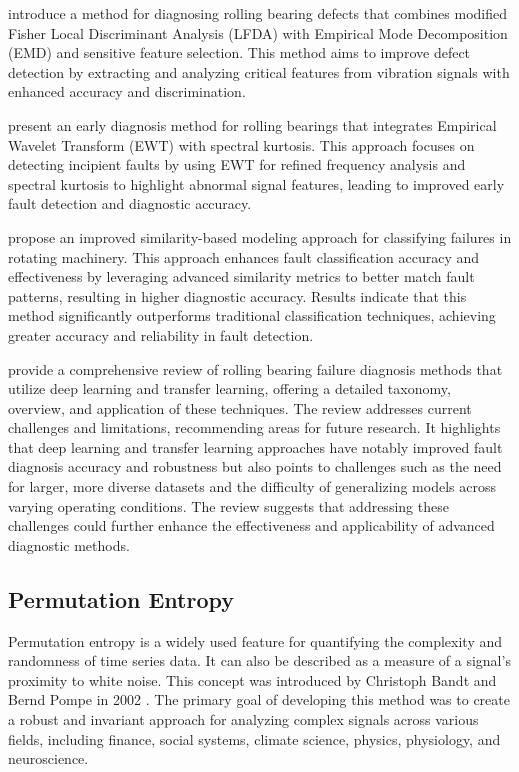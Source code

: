 \documentclass[sn-basic,pdflatex]{sn-jnl}
\theoremstyle{remark}
\theoremstyle{definition}
\begin{document}
\citet{WOS:000426284100001} introduce a method for diagnosing rolling
bearing defects that combines modified Fisher Local Discriminant
Analysis (LFDA) with Empirical Mode Decomposition (EMD) and sensitive
feature selection. This method aims to improve defect detection by
extracting and analyzing critical features from vibration signals with
enhanced accuracy and discrimination.

\citet{WOS:000539546400083} present an early diagnosis method for
rolling bearings that integrates Empirical Wavelet Transform (EWT) with
spectral kurtosis. This approach focuses on detecting incipient faults
by using EWT for refined frequency analysis and spectral kurtosis to
highlight abnormal signal features, leading to improved early fault
detection and diagnostic accuracy.

\citet{WOS:000426986200020} propose an improved similarity-based
modeling approach for classifying failures in rotating machinery. This
approach enhances fault classification accuracy and effectiveness by
leveraging advanced similarity metrics to better match fault patterns,
resulting in higher diagnostic accuracy. Results indicate that this
method significantly outperforms traditional classification techniques,
achieving greater accuracy and reliability in fault detection.

\citet{hakim2023systematic} provide a comprehensive review of rolling
bearing failure diagnosis methods that utilize deep learning and
transfer learning, offering a detailed taxonomy, overview, and
application of these techniques. The review addresses current challenges
and limitations, recommending areas for future research. It highlights
that deep learning and transfer learning approaches have notably
improved fault diagnosis accuracy and robustness but also points to
challenges such as the need for larger, more diverse datasets and the
difficulty of generalizing models across varying operating conditions.
The review suggests that addressing these challenges could further
enhance the effectiveness and applicability of advanced diagnostic
methods.

\subsection{Permutation Entropy}\label{permutation-entropy}

Permutation entropy is a widely used feature for quantifying the
complexity and randomness of time series data. It can also be described
as a measure of a signal's proximity to white noise. This concept was
introduced by Christoph Bandt and Bernd Pompe in 2002
\citep{PhysRevLett.88.174102}. The primary goal of developing this
method was to create a robust and invariant approach for analyzing
complex signals across various fields, including finance, social
systems, climate science, physics, physiology, and neuroscience.
\end{document}
